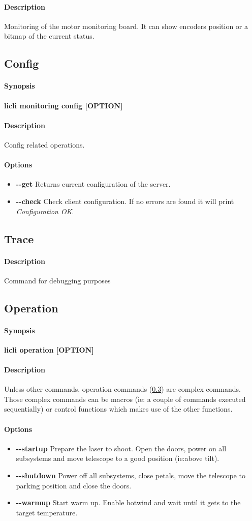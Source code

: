 \documentclass[letterpaper, 10 pt]{article}
\newcommand{\cmdsection}[1]{\paragraph{#1}\mbox{}\par}
\begin{document}
\cmdsection{Description} Monitoring of the motor monitoring board. It can show encoders position or a bitmap of the current status.

\subsection{Config}
\cmdsection{Synopsis} \textbf{licli monitoring config [OPTION]}\\

\cmdsection{Description} Config related operations. \\
\cmdsection{Options}
\begin{itemize}
	\item[] \textbf{-{}-get} Returns current configuration of the server.
	\item[] \textbf{-{}-check} Check client configuration. If no errors are found it will print \emph{Configuration OK}.
\end{itemize}

\subsection{Trace}
\cmdsection{Description} Command for debugging purposes

\subsection{Operation} \label{operationcmds}
\cmdsection{Synopsis} \textbf{licli operation [OPTION]}\\

\cmdsection{Description} Unless other commands, operation commands (\ref{operationcmds}) are complex commands. Those complex commands can be macros (ie: a couple of commands executed sequentially) or control functions which makes use of the other functions. \\
\cmdsection{Options}
\begin{itemize}
	\item[] \textbf{-{}-startup} Prepare the laser to shoot. Open the doors, power on all subsystems and move telescope to a good position (ie:above tilt).
	\item[] \textbf{-{}-shutdown} Power off all subsystems, close petals, move the telescope to parking position and close the doors.
	\item[] \textbf{-{}-warmup} Start warm up. Enable hotwind and wait until it gets to the target temperature.
\end{itemize}
\end{document}
